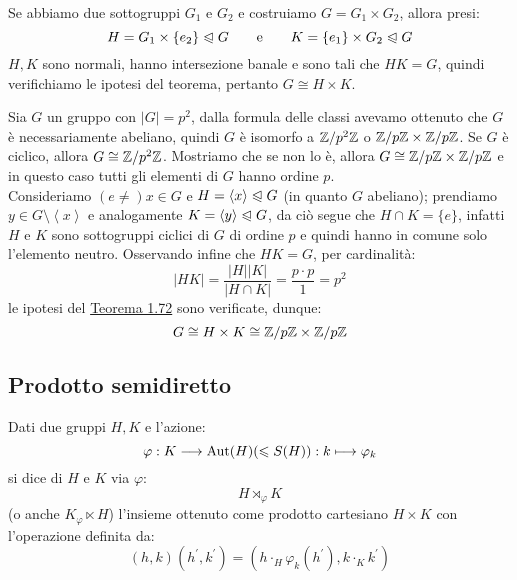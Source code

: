 \documentclass[11pt]{scrartcl}
\begin{document}
\begin{remark}
    Se abbiamo due sottogruppi $G_1$ e $G_2$ e costruiamo $G = G_1 \times G_2$, allora presi:
        \[ H = G_1 \times \{e_2\} \trianglelefteqslant G \qquad \text e \qquad K = \{e_1\} \times G_2 \trianglelefteqslant G
            \]
    $H,K$ sono normali, hanno intersezione banale e sono tali che $HK = G$, quindi verifichiamo le ipotesi del teorema, pertanto $G \cong H \times K$.
\end{remark}

\begin{example}
    Sia $G$ un gruppo con $|G| = p^2$, dalla formula delle classi avevamo ottenuto che $G$ è necessariamente abeliano, quindi $G$ è 
    isomorfo a $\mathbb Z/p^2\mathbb Z$ o ${\mathbb Z}/p{\mathbb Z} \times {\mathbb Z}/p{\mathbb Z}$. Se $G$ è ciclico, allora $G \cong \mathbb Z/p^2\mathbb Z$. Mostriamo che se non lo è, allora $G \cong {\mathbb Z}/p{\mathbb Z} \times {\mathbb Z}/p{\mathbb Z}$ e in 
    questo caso tutti gli elementi di $G$ hanno ordine $p$. \\
    Consideriamo $(e \ne) x \in G$ e $H = \left<x\right> \trianglelefteqslant G$ (in quanto $G$ abeliano); prendiamo $y \in G \setminus\left<x\right>$
    e analogamente $K = \left<y\right> \trianglelefteqslant G$, da ciò segue che $H \cap K = \{e\}$, infatti $H$ e $K$ sono sottogruppi ciclici di $G$ di 
    ordine $p$ e quindi hanno in comune solo l'elemento neutro.
    Osservando infine che $HK = G$, per cardinalità:
        \[ |HK| = \frac{|H||K|}{|H \cap K|} = \frac{p\cdot p}{1} = p^2
            \]
    le ipotesi del \hyperref[t:1.72]{Teorema 1.72} sono verificate, dunque:
        \[ G \cong H \times K \cong {\mathbb Z}/p{\mathbb Z} \times {\mathbb Z}/p{\mathbb Z}
            \]
\end{example}

\newpage
\subsection{Prodotto semidiretto}

\begin{definition}
    Dati due gruppi $H,K$ e l'azione:
        \[ \varphi : K \longrightarrow \operatorname{Aut}(H) (\leqslant S(H)) : k \longmapsto \varphi_k
            \]
    si dice  di $H$ e $K$ via $\varphi$:
        \[ H \rtimes_{\varphi} K
            \]
    (o anche $K {_\varphi}\ltimes H$) l'insieme ottenuto come prodotto cartesiano $H \times K$ con l'operazione definita da:
        \[ (h,k) (h^{\prime},k^{\prime}) = (h \cdot_H \varphi_k(h^{\prime}), k \cdot_K k^{\prime})
            \]
\end{definition}
\end{document}
